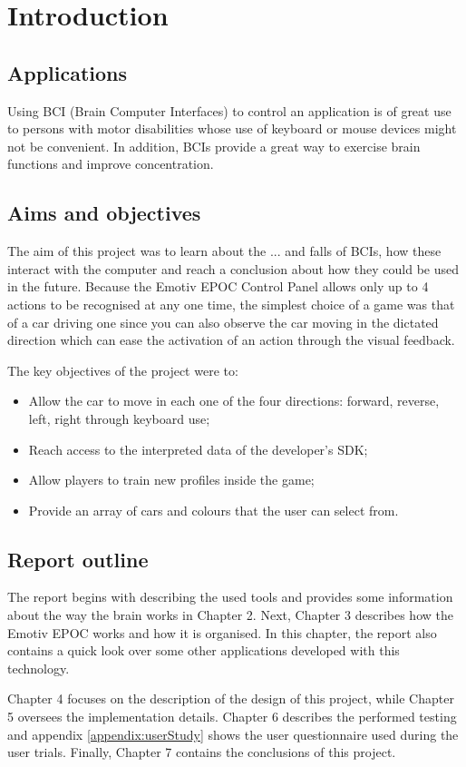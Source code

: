 \chapter{Introduction}
\label{cha:intro}

\section{Applications}

Using BCI (Brain Computer Interfaces) to control an application is of great use to persons with motor disabilities whose use of keyboard or mouse devices might not be convenient. In addition,  BCIs provide a great way to exercise brain functions and improve concentration.

\section{Aims and objectives}

The aim of this project was to learn about the ... and falls of BCIs, how these interact with the computer and reach a conclusion about how they could be used in the future. Because the Emotiv EPOC Control Panel allows only up to 4 actions to be recognised at any one time, the simplest choice of a game was that of a car driving one since you can also observe the car moving in the dictated direction which can ease the activation of an action through the visual feedback.

The key objectives of the project were to:
\begin{itemize}
	\item Allow the car to move in each one of the four directions: forward, reverse, left, right through keyboard use; 
	\item Reach access to the interpreted data of the developer's SDK;
	\item Allow players to train new profiles inside the game;
	\item Provide an array of cars and colours that the user can select from.
\end{itemize}

\section{Report outline}

The report begins with describing the used tools and provides some information about the way the brain works in Chapter 2. Next, Chapter 3 describes how the Emotiv EPOC works and how it is organised. In this chapter, the report also contains a quick look over some other applications developed with this technology.

Chapter 4 focuses on the description of the design of this project, while Chapter 5 oversees the implementation details. Chapter 6 describes the performed testing and appendix \ref{appendix:userStudy} shows the user questionnaire used during the user trials. Finally, Chapter 7 contains the conclusions of this project.